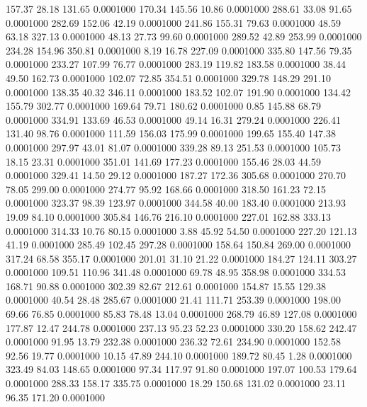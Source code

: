  157.37   28.18  131.65   0.0001000
 170.34  145.56   10.86   0.0001000
 288.61   33.08   91.65   0.0001000
 282.69  152.06   42.19   0.0001000
 241.86  155.31   79.63   0.0001000
  48.59   63.18  327.13   0.0001000
  48.13   27.73   99.60   0.0001000
 289.52   42.89  253.99   0.0001000
 234.28  154.96  350.81   0.0001000
   8.19   16.78  227.09   0.0001000
 335.80  147.56   79.35   0.0001000
 233.27  107.99   76.77   0.0001000
 283.19  119.82  183.58   0.0001000
  38.44   49.50  162.73   0.0001000
 102.07   72.85  354.51   0.0001000
 329.78  148.29  291.10   0.0001000
 138.35   40.32  346.11   0.0001000
 183.52  102.07  191.90   0.0001000
 134.42  155.79  302.77   0.0001000
 169.64   79.71  180.62   0.0001000
   0.85  145.88   68.79   0.0001000
 334.91  133.69   46.53   0.0001000
  49.14   16.31  279.24   0.0001000
 226.41  131.40   98.76   0.0001000
 111.59  156.03  175.99   0.0001000
 199.65  155.40  147.38   0.0001000
 297.97   43.01   81.07   0.0001000
 339.28   89.13  251.53   0.0001000
 105.73   18.15   23.31   0.0001000
 351.01  141.69  177.23   0.0001000
 155.46   28.03   44.59   0.0001000
 329.41   14.50   29.12   0.0001000
 187.27  172.36  305.68   0.0001000
 270.70   78.05  299.00   0.0001000
 274.77   95.92  168.66   0.0001000
 318.50  161.23   72.15   0.0001000
 323.37   98.39  123.97   0.0001000
 344.58   40.00  183.40   0.0001000
 213.93   19.09   84.10   0.0001000
 305.84  146.76  216.10   0.0001000
 227.01  162.88  333.13   0.0001000
 314.33   10.76   80.15   0.0001000
   3.88   45.92   54.50   0.0001000
 227.20  121.13   41.19   0.0001000
 285.49  102.45  297.28   0.0001000
 158.64  150.84  269.00   0.0001000
 317.24   68.58  355.17   0.0001000
 201.01   31.10   21.22   0.0001000
 184.27  124.11  303.27   0.0001000
 109.51  110.96  341.48   0.0001000
  69.78   48.95  358.98   0.0001000
 334.53  168.71   90.88   0.0001000
 302.39   82.67  212.61   0.0001000
 154.87   15.55  129.38   0.0001000
  40.54   28.48  285.67   0.0001000
  21.41  111.71  253.39   0.0001000
 198.00   69.66   76.85   0.0001000
  85.83   78.48   13.04   0.0001000
 268.79   46.89  127.08   0.0001000
 177.87   12.47  244.78   0.0001000
 237.13   95.23   52.23   0.0001000
 330.20  158.62  242.47   0.0001000
  91.95   13.79  232.38   0.0001000
 236.32   72.61  234.90   0.0001000
 152.58   92.56   19.77   0.0001000
  10.15   47.89  244.10   0.0001000
 189.72   80.45    1.28   0.0001000
 323.49   84.03  148.65   0.0001000
  97.34  117.97   91.80   0.0001000
 197.07  100.53  179.64   0.0001000
 288.33  158.17  335.75   0.0001000
  18.29  150.68  131.02   0.0001000
  23.11   96.35  171.20   0.0001000
